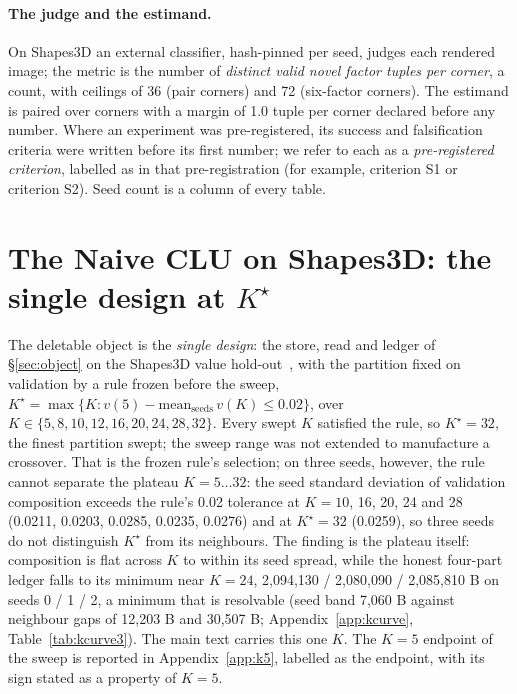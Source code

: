 \documentclass{article} %
\newcommand{\Kstar}{\ensuremath{K^{\star}}}
\begin{document}
\paragraph{The judge and the estimand.} On Shapes3D an external classifier, hash-pinned per
seed, judges each rendered image; the metric is the number of \emph{distinct valid novel
factor tuples per corner}, a count, with ceilings of 36 (pair corners) and 72 (six-factor
corners). The estimand is paired over corners with a margin of 1.0 tuple per corner declared
before any number. %
Where an experiment was pre-registered, its success and falsification criteria were written before
its first number; we refer to each as a \emph{pre-registered criterion}, labelled as in that
pre-registration (for example, criterion S1 or criterion S2).
Seed count is a column of every table.

\section{The Naive CLU on Shapes3D: the single design at $\Kstar$}
\label{sec:shapes}

The deletable object is the \emph{single design}: the store, read and ledger of
\S\ref{sec:object} on the Shapes3D value hold-out~\citep{montero2021role,schott2021visual}, with the partition fixed on validation
by a rule frozen before the sweep, $\Kstar=\max\{K : v(5)-\text{mean}_{\text{seeds}}\,v(K)\le
0.02\}$, over $K\in\{5,8,10,12,16,20,24,28,32\}$. Every swept $K$ satisfied the rule, so
$\Kstar=32$, the finest partition swept; the sweep range was not extended to manufacture a
crossover. %
That is the frozen rule's selection; on three seeds, however, the rule cannot separate the plateau
$K=5\ldots32$: the seed standard deviation of validation composition exceeds the rule's 0.02
tolerance at $K=10$, 16, 20, 24 and 28 (0.0211, 0.0203, 0.0285, 0.0235, 0.0276) and at $\Kstar=32$ %
(0.0259), so three seeds do not distinguish $\Kstar$ from its neighbours. %
The finding is the plateau itself: composition is flat across $K$ to within its seed spread, while
the honest four-part ledger falls to its minimum near $K=24$, 2,094,130 / 2,080,090 / 2,085,810 B %
on seeds 0 / 1 / 2, a minimum that is resolvable (seed band 7,060 B against neighbour gaps of %
12,203 B and 30,507 B; Appendix~\ref{app:kcurve}, Table~\ref{tab:kcurve3}). %
The main text carries this one $K$. The $K=5$ endpoint of the sweep is reported in
Appendix~\ref{app:k5}, labelled as the endpoint, with its sign stated as a property of $K=5$.
\end{document}
